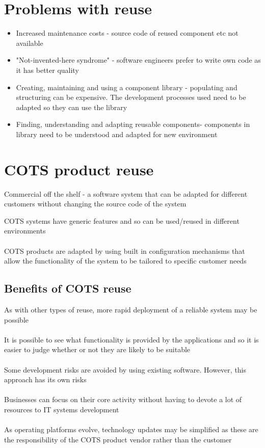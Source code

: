 \documentclass{article}[18pt]
\begin{document}
\section{Problems with reuse}
\begin{itemize}
	\item Increased maintenance costs - source code of reused component etc not available
	\item "Not-invented-here syndrome" - software engineers prefer to write own code as it has better quality
	\item Creating, maintaining and using a component library - populating and structuring can be expensive. The development processes used need to be adapted so they can use the library
	\item Finding, understanding and adapting reusable components- components in library need to be understood and adapted for new environment
\end{itemize}
\section{COTS product reuse}
\begin{definition}[COTS]
Commercial off the shelf - a software system that can be adapted for different customers without changing the source code of the system
\end{definition}
COTS systems have generic features and so can be used/reused in different environments\\
\\
COTS products are adapted by using built in configuration mechanisms that allow the functionality of the system to be tailored to specific customer needs
\subsection{Benefits of COTS reuse}
As with other types of reuse, more rapid deployment of a reliable system may be possible\\
\\
It is possible to see what functionality is provided by the applications and so it is easier to judge whether or not they are likely to be suitable\\
\\
Some development risks are avoided by using existing software. However, this approach has its own risks\\
\\
Businesses can focus on their core activity without having to devote a lot of resources to IT systems development\\
\\
As operating platforms evolve, technology updates may be simplified as these are the responsibility of the COTS product vendor rather than the customer
\end{document}
